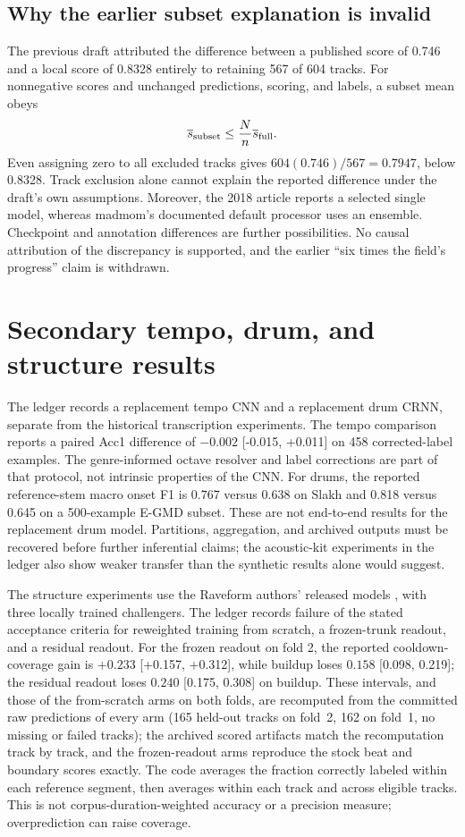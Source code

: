 \documentclass[11pt]{article}
\newcommand{\ci}[2]{{\small[#1, #2]}}
\begin{document}
\subsection{Why the earlier subset explanation is invalid}
The previous draft attributed the difference between a published score of 0.746
and a local score of 0.8328 entirely to retaining 567 of 604 tracks. For nonnegative
scores and unchanged predictions, scoring, and labels, a subset mean obeys
\begin{equation}
 \overline s_{\rm subset}\leq \frac{N}{n}\overline s_{\rm full}.
\end{equation}
Even assigning zero to all excluded tracks gives
$604(0.746)/567=0.7947$, below 0.8328. Track exclusion alone cannot explain the
reported difference under the draft's own assumptions. Moreover, the 2018 article
reports a selected single model, whereas madmom's documented default processor
uses an ensemble. Checkpoint and annotation differences are further possibilities.
No causal attribution of the discrepancy is supported, and the earlier ``six times
the field's progress'' claim is withdrawn.

\section{Secondary tempo, drum, and structure results}
The ledger records a replacement tempo CNN and a replacement drum CRNN, separate
from the historical transcription experiments. The tempo comparison reports a
paired Acc1 difference of $-0.002$ \ci{-0.015}{+0.011} on 458 corrected-label
examples. The genre-informed octave resolver and label corrections are part of
that protocol, not intrinsic properties of the CNN. For drums, the reported
reference-stem macro onset F1 is 0.767 versus 0.638 on Slakh and 0.818 versus
0.645 on a 500-example E-GMD subset. These are not end-to-end results for the
replacement drum model. Partitions, aggregation, and archived outputs must be
recovered before further inferential claims; the acoustic-kit experiments in the
ledger also show weaker transfer than the synthetic results alone would suggest.

The structure experiments use the Raveform authors' released models
\citep{kim2026raveform}, with three locally trained challengers. The ledger records
failure of the stated acceptance criteria for reweighted training from scratch,
a frozen-trunk readout, and a residual readout. For the frozen readout on fold 2,
the reported cooldown-coverage gain is $+0.233$ \ci{+0.157}{+0.312}, while buildup
loses $0.158$ \ci{0.098}{0.219}; the residual readout loses $0.240$
\ci{0.175}{0.308} on buildup. These intervals, and those of the from-scratch
arms on both folds, are recomputed from the committed raw predictions of every
arm (165 held-out tracks on fold~2, 162 on fold~1, no missing or failed tracks);
the archived scored artifacts match the recomputation track by track, and the
frozen-readout arms reproduce the stock beat and boundary scores exactly. The code
averages the fraction correctly labeled within each reference segment, then
averages within each track and across eligible tracks. This is not
corpus-duration-weighted accuracy or a precision measure; overprediction can raise
coverage.
\end{document}
